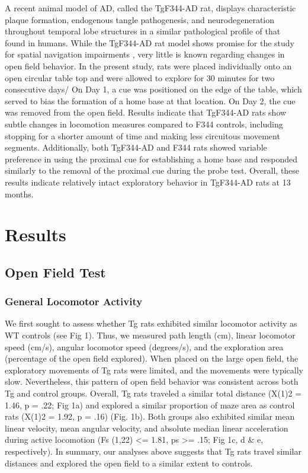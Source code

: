 \documentclass[fleqn,10pt]{wlscirep}
\begin{document}
A recent animal model of AD, called the TgF344-AD rat, displays characteristic plaque formation, endogenous tangle pathogenesis, and neurodegeneration throughout temporal lobe structures in a similar pathological profile of that found in humans. While the TgF344-AD rat model shows promise for the study for spatial navigation impairments \cite{berkowitz_progressive_2018}, very little is known regarding changes in open field behavior. In the present study, rats were placed individually onto an open circular table top and were allowed to explore for 30 minutes for two consecutive days/ On Day 1, a cue was positioned on the edge of the table, which served to bias the formation of a home base at that location. On Day 2, the cue was removed from the open field. Results indicate that TgF344-AD rats show subtle changes in locomotion measures compared to F344 controls, including stopping for a shorter amount of time and making less circuitous movement segments. Additionally, both TgF344-AD and F344 rats showed variable preference in using the proximal cue for establishing a home base and responded similarly to the removal of the proximal cue during the probe test. Overall, these results indicate relatively intact exploratory behavior in TgF344-AD rats at 13 months.   

\section*{Results}

\subsection*{Open Field Test}

\subsubsection*{General Locomotor Activity}
We first sought to assess whether Tg rats exhibited similar locomotor activity as WT controls (see Fig 1). Thus, we measured path length (cm), linear locomotor speed (cm/s), angular locomotor speed (degrees/s), and the exploration area (percentage of the open field explored). When placed on the large open field, the exploratory movements of Tg rats were limited, and the movements were typically slow. Nevertheless, this pattern of open field behavior was consistent across both Tg and control groups. Overall, Tg rats traveled a similar total distance (X(1)2 = 1.46, p = .22; Fig 1a) and explored a similar proportion of maze area as control rats (X(1)2 = 1.92, p = .16) (Fig. 1b). Both groups also exhibited similar mean linear velocity, mean angular velocity, and absolute median linear acceleration during active locomotion (Fs (1,22) <= 1.81, ps >= .15; Fig 1c, d \& e, respectively). In summary, our analyses above suggests that Tg rats travel similar distances and explored the open field to a similar extent to controls.  
\end{document}
